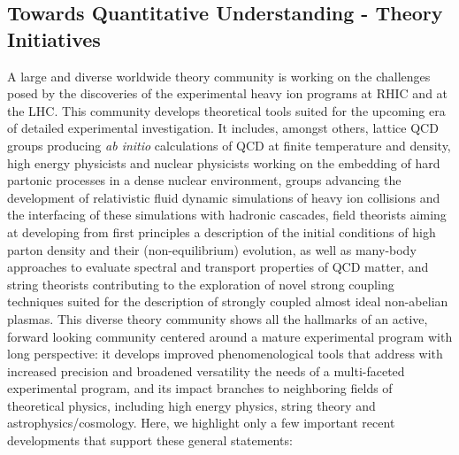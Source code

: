 \subsection{Towards Quantitative Understanding - Theory Initiatives}
\label{Sec:Theory}

A large and diverse worldwide theory community is working on the challenges
posed by the discoveries of the experimental heavy ion programs at RHIC and at the LHC.
This community develops theoretical tools suited for the upcoming era of detailed experimental
investigation. It includes, amongst others, lattice QCD groups producing
{\em ab initio} calculations of QCD at  finite temperature and density, high energy physicists and nuclear physicists
working on the embedding of hard partonic processes in a dense nuclear environment, groups advancing
the development of relativistic fluid dynamic simulations of heavy ion collisions and the interfacing of these
simulations with hadronic cascades, field theorists aiming at developing from first principles a description of
the initial conditions of high parton density and their (non-equilibrium) evolution, 
as well as many-body approaches to evaluate spectral and transport properties of QCD matter,
and string theorists contributing
to the exploration of novel strong coupling techniques suited for the description of strongly coupled almost
ideal non-abelian plasmas. This diverse theory community shows all the hallmarks of an active, forward looking
community centered around a mature experimental program with long perspective: it develops improved 
phenomenological tools that address with increased precision and broadened versatility the needs of a
multi-faceted experimental program, and its impact branches to neighboring fields of theoretical physics,
including high energy physics, string theory and astrophysics/cosmology. Here, we highlight only a few 
important recent developments that support these general statements:

